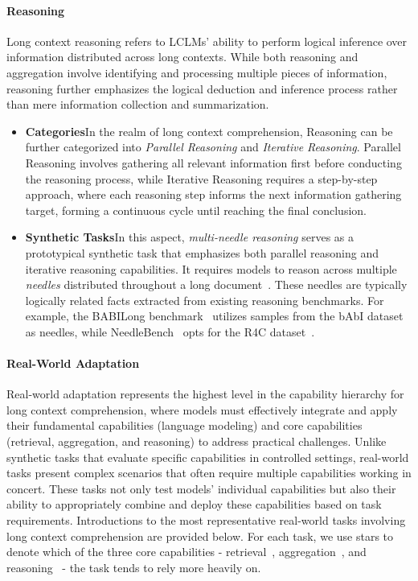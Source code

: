 \documentclass[11pt, a4paper, logo, copyright, nonumbering]{map}
\begin{document}
\paragraph{Reasoning} Long context reasoning refers to LCLMs' ability to perform logical inference over information distributed across long contexts. While both reasoning and aggregation involve identifying and processing multiple pieces of information, reasoning further emphasizes the logical deduction and inference process rather than mere information collection and summarization. 
\begin{itemize}
    \item \textbf{Categories}\quad In the realm of long context comprehension, Reasoning can be further categorized into \textit{Parallel Reasoning} and \textit{Iterative Reasoning}. Parallel Reasoning involves gathering all relevant information first before conducting the reasoning process, while Iterative Reasoning requires a step-by-step approach, where each reasoning step informs the next information gathering target, forming a continuous cycle until reaching the final conclusion.
    \item \textbf{Synthetic Tasks}\quad In this aspect, \textit{multi-needle reasoning} serves as a prototypical synthetic task that emphasizes both parallel reasoning and iterative reasoning capabilities. It requires models to reason across multiple \textit{needles} distributed throughout a long document~\citep{li2024needlebench,kuratov2024babilong}. These needles are typically logically related facts extracted from existing reasoning benchmarks. For example, the BABILong benchmark~\citep{kuratov2024babilong} utilizes samples from the bAbI dataset~\citep{weston2015towards} as needles, while NeedleBench~\citep{li2024needlebench} opts for the R4C dataset~\citep{inoue2020r4c}. 
\end{itemize}
\paragraph{Real-World Adaptation} Real-world adaptation represents the highest level in the capability hierarchy for long context comprehension, where models must effectively integrate and apply their fundamental capabilities (language modeling) and core capabilities (retrieval, aggregation, and reasoning) to address practical challenges. Unlike synthetic tasks that evaluate specific capabilities in controlled settings, real-world tasks present complex scenarios that often require multiple capabilities working in concert. These tasks not only test models' individual capabilities but also their ability to appropriately combine and deploy these capabilities based on task requirements. Introductions to the most representative real-world tasks involving long context comprehension are provided below. For each task, we use stars to denote which of the three core capabilities - retrieval~, aggregation~, and reasoning~ - the task tends to rely more heavily on.
\end{document}
